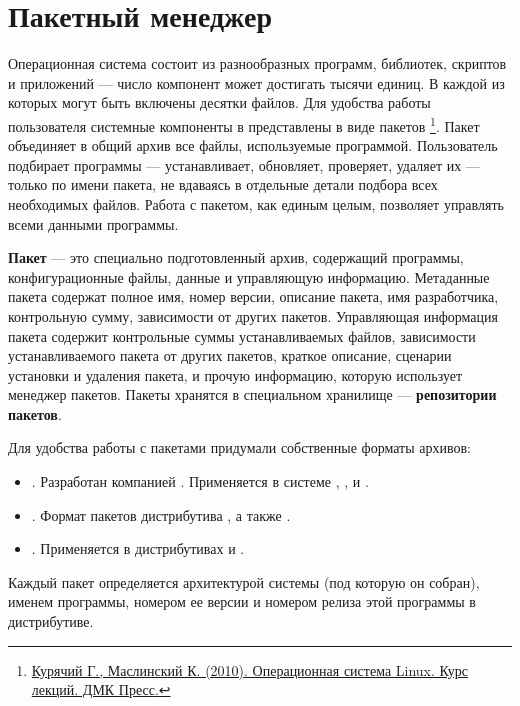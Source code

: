 \chapter{Пакетный менеджер}\label{package-manager}
Операционная система состоит из разнообразных программ, библиотек, скриптов и приложений --- число компонент может достигать тысячи единиц. В каждой из которых могут быть включены десятки файлов. Для удобства работы пользователя системные компоненты в  представлены в виде пакетов \footnote{\href{https://docs.altlinux.org/books/altlibrary-linuxintro2.pdf}{Курячий Г., Маслинский К. (2010). Операционная система Linux. Курс лекций. ДМК Пресс.}}. Пакет объединяет в общий архив все файлы, используемые программой. Пользователь подбирает программы --- устанавливает, обновляет, проверяет, удаляет их --- только по имени пакета, не вдаваясь в отдельные детали подбора всех необходимых файлов. Работа с пакетом, как единым целым, позволяет управлять всеми данными программы.

\textbf{Пакет} --- это специально подготовленный архив, содержащий программы, конфигурационные файлы, данные и управляющую информацию. Метаданные пакета содержат полное имя, номер версии, описание пакета, имя разработчика, контрольную сумму, зависимости от других пакетов. Управляющая информация пакета содержит контрольные суммы устанавливаемых файлов, зависимости устанавливаемого пакета от других пакетов, краткое описание, сценарии установки и удаления пакета, и прочую информацию, которую использует менеджер пакетов. Пакеты хранятся в специальном хранилище --- \textbf{репозитории пакетов}.

Для удобства работы с пакетами придумали собственные форматы архивов:

\begin{itemize}
	\item {}. Разработан компанией . Применяется в системе , ,  и .
	\item {}. Формат пакетов дистрибутива , а также .
	\item {}. Применяется в дистрибутивах  и .
	
\end{itemize}

Каждый пакет определяется архитектурой системы (под которую он собран), именем программы, номером ее версии и номером релиза этой программы в дистрибутиве. 

